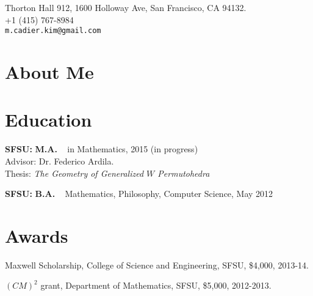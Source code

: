 \documentclass[margin,line,pifont,palatino,courier]{res}
\newenvironment{list1}{
  \begin{list}{\label{}}{%
      \setlength{\itemsep}{0in}
      \setlength{\parsep}{0in} \setlength{\parskip}{0in}
      \setlength{\topsep}{0in} \setlength{\partopsep}{0in}
      \setlength{\leftmargin}{0.0in}}}{\end{list}}
\begin{document}


\begin{resume}




\begin{flushright}
{\small
Thorton Hall 912, 1600 Holloway Ave, San Francisco, CA 94132. \\
+1 (415) 767-8984\\
  \verb+m.cadier.kim@gmail.com+
}
\end{flushright}
 
\section{\sc  About Me}




 \section{\sc Education} 
\begin{list1}
\item  {\bf SFSU:}  \textbf{M.A.} ~ in Mathematics, 2015 (in progress) \\
Advisor: Dr. Federico Ardila. \\
 Thesis: {\em The Geometry of Generalized $W$ Permutohedra} 


\item  {\bf SFSU:}  \textbf{B.A.} ~ Mathematics, Philosophy, Computer Science, May 2012 

\end{list1}





 \section{\sc Awards}
\begin{list1}
  \item  Maxwell Scholarship, College of Science and Engineering, SFSU, \$4,000,  2013-14.
  \item $(CM)^2$ grant, Department of Mathematics, SFSU, \$5,000, 2012-2013.
\end{list1}







\end{resume}
\end{document}
